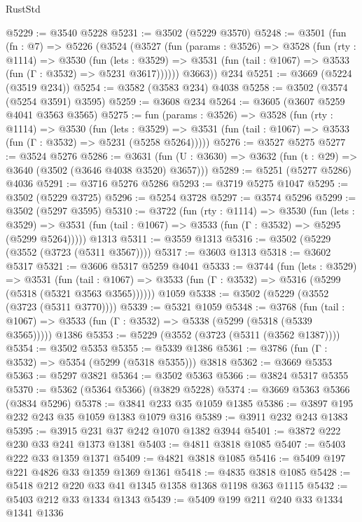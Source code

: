 \begin{lexlean}{RustStd}
\begin{coremodule}
@5229 := @3540 @5228
@5231 := @3502 (@5229 @3570)
@5248 := @3501
    (fun (fn : @7) =>
    @5226
      (@3524
        (@3527
          (fun (params : @3526) =>
          @3528
            (fun (rty : @1114) =>
            @3530
              (fun (lets : @3529) =>
              @3531 (fun (tail : @1067) => @3533 (fun (Γ : @3532) => @5231 @3617))))))
        @3663))
    @234
@5251 := @3669 (@5224 (@3519 @234))
@5254 := @3582 (@3583 @234) @4038
@5258 := @3502 (@3574 (@5254 @3591) @3595)
@5259 := @3608 @234
@5264 := @3605 (@3607 @5259 @4041 @3563 @3565)
@5275 := fun (params : @3526) =>
  @3528
    (fun (rty : @1114) =>
    @3530
      (fun (lets : @3529) =>
      @3531 (fun (tail : @1067) => @3533 (fun (Γ : @3532) => @5231 (@5258 @5264)))))
@5276 := @3527 @5275
@5277 := @3524 @5276
@5286 := @3631 (fun (U : @3630) => @3632 (fun (t : @29) => @3640 (@3502 (@3646 @4038 @3520) @3657)))
@5289 := @5251 (@5277 @5286) @4036
@5291 := @3716 @5276 @5286
@5293 := @3719 @5275 @1047
@5295 := @3502 (@5229 @3725)
@5296 := @5254 @3728
@5297 := @3574 @5296
@5299 := @3502 (@5297 @3595)
@5310 := @3722
    (fun (rty : @1114) =>
    @3530
      (fun (lets : @3529) =>
      @3531 (fun (tail : @1067) => @3533 (fun (Γ : @3532) => @5295 (@5299 @5264)))))
    @1313
@5311 := @3559 @1313
@5316 := @3502 (@5229 (@3552 (@3723 (@5311 @3567))))
@5317 := @3603 @1313
@5318 := @3602 @5317
@5321 := @3606 @5317 @5259 @4041
@5333 := @3744
    (fun (lets : @3529) =>
    @3531
      (fun (tail : @1067) => @3533 (fun (Γ : @3532) => @5316 (@5299 (@5318 (@5321 @3563 @3565))))))
    @1059
@5338 := @3502 (@5229 (@3552 (@3723 (@5311 @3770))))
@5339 := @5321 @1059
@5348 := @3768
    (fun (tail : @1067) => @3533 (fun (Γ : @3532) => @5338 (@5299 (@5318 (@5339 @3565)))))
    @1386
@5353 := @5229 (@3552 (@3723 (@5311 (@3562 @1387))))
@5354 := @3502 @5353
@5355 := @5339 @1386
@5361 := @3786 (fun (Γ : @3532) => @5354 (@5299 (@5318 @5355))) @3818
@5362 := @3669 @5353
@5363 := @5297 @3821
@5364 := @3502 @5363
@5366 := @3824 @5317 @5355
@5370 := @5362 (@5364 @5366) (@3829 @5228)
@5374 := @3669 @5363 @5366 (@3834 @5296)
@5378 := @3841 @233 @35 @1059 @1385
@5386 := @3897 @195 @232 @243 @35 @1059 @1383 @1079 @316
@5389 := @3911 @232 @243 @1383
@5395 := @3915 @231 @37 @242 @1070 @1382 @3944
@5401 := @3872 @222 @230 @33 @241 @1373 @1381
@5403 := @4811 @3818 @1085
@5407 := @5403 @222 @33 @1359 @1371
@5409 := @4821 @3818 @1085
@5416 := @5409 @197 @221 @4826 @33 @1359 @1369 @1361
@5418 := @4835 @3818 @1085
@5428 := @5418 @212 @220 @33 @41 @1345 @1358 @1368 @1198 @363 @1115
@5432 := @5403 @212 @33 @1334 @1343
@5439 := @5409 @199 @211 @240 @33 @1334 @1341 @1336

\end{coremodule}
\end{lexlean}
